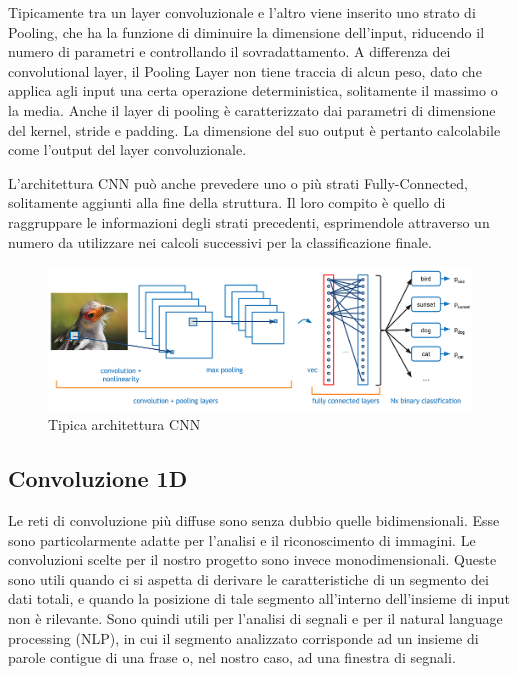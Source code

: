 \documentclass{article}
\begin{document}
Tipicamente tra un layer convoluzionale e l'altro viene inserito uno strato di Pooling, che ha la funzione di diminuire la dimensione dell'input, riducendo il numero di parametri e controllando il sovradattamento. A differenza dei convolutional layer, il Pooling Layer non tiene traccia di alcun peso, dato che applica agli input una certa operazione deterministica, solitamente il massimo o la media.
Anche il layer di pooling è caratterizzato dai parametri di dimensione del kernel, stride e padding. La dimensione del suo output è pertanto calcolabile come l'output del layer convoluzionale.

L'architettura CNN può anche prevedere uno o più strati Fully-Connected, solitamente aggiunti alla fine della struttura. Il loro compito è quello di raggruppare le informazioni degli strati precedenti, esprimendole attraverso un numero da utilizzare nei calcoli successivi per la classificazione finale. 
\begin{figure}[!h]
\centering
\includegraphics[scale=0.7]{cnnlayer}
\caption{Tipica architettura CNN}
\end{figure}

\subsection{Convoluzione 1D}
Le reti di convoluzione più diffuse sono senza dubbio quelle bidimensionali. Esse sono particolarmente adatte per l'analisi e il riconoscimento di immagini. Le convoluzioni scelte per il nostro progetto sono invece monodimensionali. Queste sono utili quando ci si aspetta di derivare le caratteristiche di un segmento dei dati totali, e quando la posizione di tale segmento all'interno dell'insieme di input non è rilevante. Sono quindi utili per l'analisi di segnali e per il natural language processing (NLP), in cui il segmento analizzato corrisponde ad un insieme di parole contigue di una frase o, nel nostro caso, ad una finestra di segnali.
\end{document}
